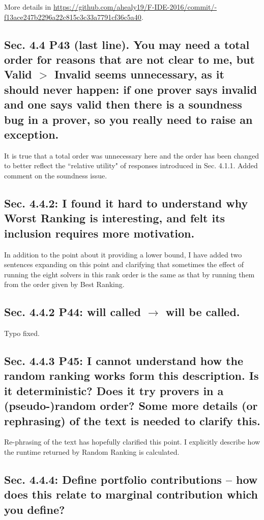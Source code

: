 \documentclass[]{article}
\begin{document}
\sloppypar
More details in \url{https://github.com/ahealy19/F-IDE-2016/commit/-f13ace247b2296a22c815c3c33a7791cf36c5a40}.

\subsection{Sec. 4.4 P43 (last line). You may need a total order for reasons that are not clear to me, but Valid $>$ Invalid seems unnecessary, as it should never happen: if one prover says invalid and one says valid then there is a soundness bug in a prover, so you really need to raise an exception.}

It is true that a total order was unnecessary here and the order has been changed to better reflect the ``relative utility" of responses introduced in Sec. 4.1.1. 
Added comment on the soundness issue.

\subsection{Sec. 4.4.2: I found it hard to understand why Worst Ranking is interesting, and felt its inclusion requires more motivation.}

In addition to the point about it providing a lower bound, I have added two sentences expanding on this point and clarifying that sometimes the effect of running the eight solvers in this rank order is the same as that by running them from the order given by \textsf{Best Ranking}.

\subsection{Sec. 4.4.2 P44: will called $\rightarrow$ will be called.}

Typo fixed.

\subsection{Sec. 4.4.3 P45: I cannot understand how the random ranking works form this description. Is it deterministic? Does it try provers in a (pseudo-)random order? Some more details (or rephrasing) of the text is needed to clarify this.}

Re-phrasing of the text has hopefully clarified this point.
I explicitly describe how the runtime returned by \textsf{Random Ranking} is calculated. 

\subsection{Sec. 4.4.4: Define portfolio contributions – how does this relate to marginal contribution which you define?}
\end{document}
